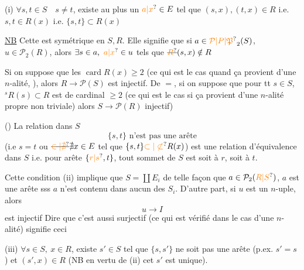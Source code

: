 (i) $\forall s,t\in S\quad s\ne t$, existe au plus un $\unsure{a|x}\in E$
tel que $(s,x),(t,x)\in R$ i.e. $s,t\in R(x)$ i.e.
$\{s,t\}\subset R(x)$

\margin{\deleted{[\uline{NB} Cette condition est symétrique en $S,R$ elle signifie en fait \unsure{soit|si $s\ne t$} $x\ne y$ $(s,t\in S,\ x,y\in R)$ alors il existe au moins un $\{s,t\}$ \unsure{$s\mapsto x$}}}

\uline{NB} Cette  est symétrique en $S,R$. Elle
signifie que si $a\in\unsure{\mathcal P|P|\mathfrak P}_2(S)$, $u\in\mathcal P_2(R)$,
alors $\exists s\in a,\ \unsure{a|x}\in u$ tels que $\deleted{\unsure{R}}(s,x)\notin R$

Si on suppose que les  $\operatorname{card}R(x)\geq2$
 (ce qui est le cas quand ça provient
d'une  $n$-alité, ), alors
$R\longrightarrow\mathcal P(S)$ est injectif. De $=$, si on
suppose que pour tt $s\in S$, $ {}^{s}\!R(s)\subset R$ est
de cardinal $\geq2$ (ce qui est le cas si
ça provient d'une $n$-alité propre non triviale)
alors $S\longrightarrow\mathcal P(R)$ injectif)

() La relation dans $S$
\[
\{s,t\}\text{ n'est pas une arête}
\]
(i.e $s=t$ ou $\deleted{\unsure{\in|\nexists}}\nexists x\in E$ tel que $\{s,t\}\unsure{\subset|\not\subset}R(x)$)
est une relation d'équivalence dans $S$
i.e. pour  arête $\{\unsure{r|s},t\}$, tout
sommet de $S$ est  soit à $r$, soit
à $t$.

Cette condition (ii) implique que $S=\coprod E_i$
de telle façon que  $a\in\mathcal P_2(\unsure{R|S})$, $a$ est une
arête sss $a$ n'est contenu dans aucun
des $S_i$. D'autre part, si $u$ est un
$n$-uple, alors
\[
u\longrightarrow I
\]
est injectif  Dire que c'est aussi surjectif
(ce qui est vérifié dans le cas d'une $n$-alité)
signifie ceci

(iii) $\forall s\in S,\ x\in R$, existe $s'\in S$ tel que
$\{s,s'\}$ ne soit pas une arête (p.ex. $s'=s$) et $(s',x)\in R$
(NB en vertu de (ii) cet $s'$ est unique).

